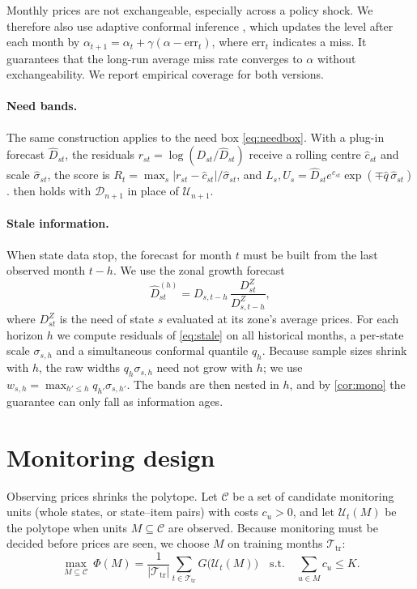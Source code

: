 \documentclass[preprint,12pt,number]{elsarticle}%
\theoremstyle{definition}
\theoremstyle{remark}
\newcommand{\U}{\mathcal{U}}
\begin{document}
Monthly prices are not exchangeable, especially across a policy shock. We therefore also use adaptive conformal inference \citep{gibbs2021aci}, which updates the level after each month by $\alpha_{t+1}=\alpha_t+\gamma(\alpha-\mathrm{err}_t)$, where $\mathrm{err}_t$ indicates a miss. It guarantees that the long-run average miss rate converges to $\alpha$ without exchangeability. We report empirical coverage for both versions.

\paragraph{Need bands.} The same construction applies to the need box \eqref{eq:needbox}. With a plug-in forecast $\hat D_{st}$, the residuals $r_{st}=\log(D_{st}/\hat D_{st})$ receive a rolling centre $\hat c_{st}$ and scale $\hat\sigma_{st}$, the score is $R_t=\max_s|r_{st}-\hat c_{st}|/\hat\sigma_{st}$, and $L_s,U_s=\hat D_{st}e^{\hat c_{st}}\exp(\mp\hat q\,\hat\sigma_{st})$.  then holds with $\mathcal D_{n+1}$ in place of $\U_{n+1}$.

\paragraph{Stale information.} When state data stop, the forecast for month $t$ must be built from the last observed month $t-h$. We use the zonal growth forecast
\begin{equation}\label{eq:stale}
\hat D^{(h)}_{st}=D_{s,t-h}\,\frac{D^{Z}_{st}}{D^{Z}_{s,t-h}},
\end{equation}
where $D^Z_{st}$ is the need of state $s$ evaluated at its zone's average prices. For each horizon $h$ we compute residuals of \eqref{eq:stale} on all historical months, a per-state scale $\sigma_{s,h}$ and a simultaneous conformal quantile $q_h$. Because sample sizes shrink with $h$, the raw widths $q_h\sigma_{s,h}$ need not grow with $h$; we use $w_{s,h}=\max_{h'\le h}q_{h'}\sigma_{s,h'}$. The bands are then nested in $h$, and by \cref{cor:mono} the guarantee can only fall as information ages.

\section{Monitoring design}\label{sec:monitor}

Observing prices shrinks the polytope. Let $\mathcal C$ be a set of candidate monitoring units (whole states, or state--item pairs) with costs $c_u>0$, and let $\U_t(M)$ be the polytope when units $M\subseteq\mathcal C$ are observed. Because monitoring must be decided before prices are seen, we choose $M$ on training months $\mathcal T_{\mathrm{tr}}$:
\begin{equation}\label{eq:monitor}
\max_{M\subseteq\mathcal C}\ \Phi(M)=\frac{1}{|\mathcal T_{\mathrm{tr}}|}\sum_{t\in\mathcal T_{\mathrm{tr}}}G\big(\U_t(M)\big)\quad\text{s.t.}\quad\sum_{u\in M}c_u\le K.
\end{equation}
\end{document}
